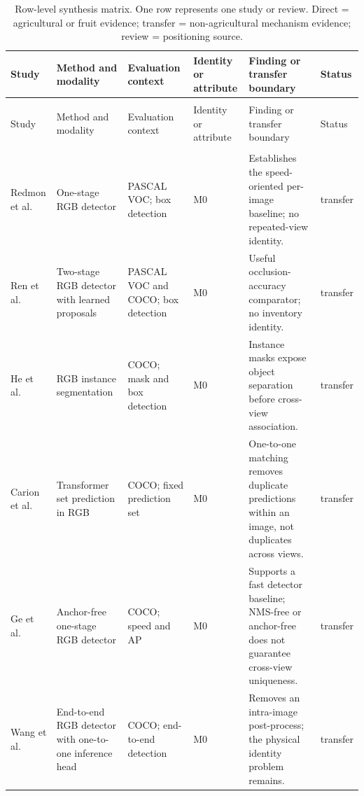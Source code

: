 \small
\setlength{\LTleft}{0pt}
\setlength{\LTright}{0pt}
\setlength{\tabcolsep}{2pt}
\begin{longtable}{@{}>{\raggedright\arraybackslash}p{}>{\raggedright\arraybackslash}p{}>{\raggedright\arraybackslash}p{}>{\raggedright\arraybackslash}p{}>{\raggedright\arraybackslash}p{}>{\raggedright\arraybackslash}p{}@{}}
\caption{Row-level synthesis matrix. One row represents one study or review. Direct = agricultural or fruit evidence; transfer = non-agricultural mechanism evidence; review = positioning source.}\label{tab:matrix2}\\
\toprule
Study & Method and modality & Evaluation context & Identity or attribute & Finding or transfer boundary & Status\\
\midrule
\endfirsthead
\multicolumn{6}{c}{\tablename\ \thetable{} continued}\\
\toprule
Study & Method and modality & Evaluation context & Identity or attribute & Finding or transfer boundary & Status\\
\midrule
\endhead
\midrule
\multicolumn{6}{r}{Continued on next page}\\
\endfoot
\bottomrule
\endlastfoot
Redmon et al. \cite{redmon2016yolo} & One-stage RGB detector & PASCAL VOC; box detection & M0 & Establishes the speed-oriented per-image baseline; no repeated-view identity. & transfer\\
Ren et al. \cite{ren2017fasterrcnn} & Two-stage RGB detector with learned proposals & PASCAL VOC and COCO; box detection & M0 & Useful occlusion-accuracy comparator; no inventory identity. & transfer\\
He et al. \cite{he2017maskrcnn} & RGB instance segmentation & COCO; mask and box detection & M0 & Instance masks expose object separation before cross-view association. & transfer\\
Carion et al. \cite{carion2020detr} & Transformer set prediction in RGB & COCO; fixed prediction set & M0 & One-to-one matching removes duplicate predictions within an image, not duplicates across views. & transfer\\
Ge et al. \cite{ge2021yolox} & Anchor-free one-stage RGB detector & COCO; speed and AP & M0 & Supports a fast detector baseline; NMS-free or anchor-free does not guarantee cross-view uniqueness. & transfer\\
Wang et al. \cite{wang2024yolov10} & End-to-end RGB detector with one-to-one inference head & COCO; end-to-end detection & M0 & Removes an intra-image post-process; the physical identity problem remains. & transfer\\

\end{longtable}
